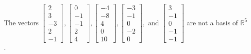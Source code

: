 \begin{exercise}
\begin{exerciseStatement}
  \end{exerciseStatement}
  \begin{exerciseAnswer}
   The vectors \(\left[\begin{array}{r}
2 \\
3 \\
-3 \\
2 \\
-1
\end{array}\right] , \left[\begin{array}{r}
0 \\
-1 \\
-1 \\
2 \\
4
\end{array}\right] , \left[\begin{array}{r}
-4 \\
-8 \\
4 \\
0 \\
10
\end{array}\right] , \left[\begin{array}{r}
-3 \\
-1 \\
0 \\
-2 \\
0
\end{array}\right] , \text{ and } \left[\begin{array}{r}
3 \\
-1 \\
0 \\
-1 \\
-1
\end{array}\right]\) 
  	 are not  a basis of \(\mathbb{R}^5\).
  


  \end{exerciseAnswer}
\end{exercise}